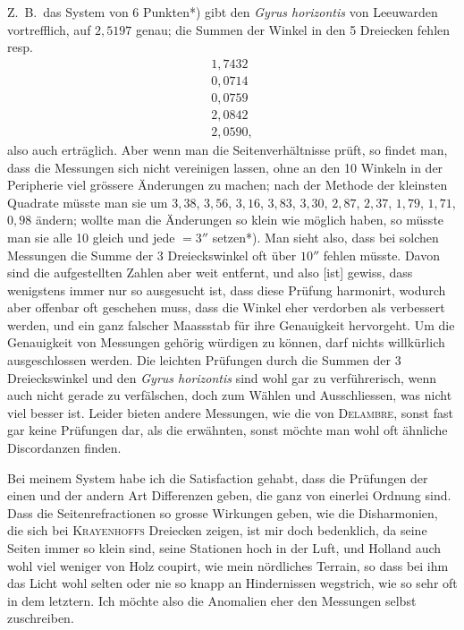 \documentclass[12pt,a4paper]{article}
\theoremstyle{plain}
\theoremstyle{definition}
\theoremstyle{remark}
\begin{document}
Z.\ B.\ das System von 6 Punkten*) gibt den \textit{Gyrus horizontis} von Leeuwarden vortrefflich, auf $2{,}5197$ genau; die Summen der Winkel in den 5 Dreiecken fehlen resp.
\begin{align*}
1{,}7432\\
0{,}0714\\
0{,}0759\\
2{,}0842\\
2{,}0590,
\end{align*}
also auch ertr\"aglich. Aber wenn man die Seitenverh\"altnisse pr\"uft, so findet man, dass die Messungen sich nicht vereinigen lassen, ohne an den 10 Winkeln in der Peripherie viel gr\"ossere \"Anderungen zu machen; nach der Methode der kleinsten Quadrate m\"usste man sie um $3{,}38$, $3{,}56$, $3{,}16$, $3{,}83$, $3{,}30$, $2{,}87$, $2{,}37$, $1{,}79$, $1{,}71$, $0{,}98$ \"andern; wollte man die \"Anderungen so klein wie m\"oglich haben, so m\"usste man sie alle 10 gleich und jede $= 3''$ setzen*). Man sieht also, dass bei solchen Messungen die Summe der 3 Dreieckswinkel oft \"uber $10''$ fehlen m\"usste. Davon sind die aufgestellten Zahlen aber weit entfernt, und also [ist] gewiss, dass wenigstens immer nur so ausgesucht ist, dass diese Pr\"ufung harmonirt, wodurch aber offenbar oft geschehen muss, dass die Winkel eher verdorben als verbessert werden, und ein ganz falscher Maassstab f\"ur ihre Genauigkeit hervorgeht. Um die Genauigkeit von Messungen geh\"orig w\"urdigen zu k\"onnen, darf nichts willk\"urlich ausgeschlossen werden. Die leichten Pr\"ufungen durch die Summen der 3 Dreieckswinkel und den \textit{Gyrus horizontis} sind wohl gar zu verf\"uhrerisch, wenn auch nicht gerade zu verf\"alschen, doch zum W\"ahlen und Ausschliessen, was nicht viel besser ist. Leider bieten andere Messungen, wie die von \textsc{Delambre}, sonst fast gar keine Pr\"ufungen dar, als die erw\"ahnten, sonst m\"ochte man wohl oft \"ahnliche Discordanzen finden.

Bei meinem System habe ich die Satisfaction gehabt, dass die Pr\"ufungen der einen und der andern Art Differenzen geben, die ganz von einerlei Ordnung sind. Dass die Seitenrefractionen so grosse Wirkungen geben, wie die Disharmonien, die sich bei \textsc{Krayenhoffs} Dreiecken zeigen, ist mir doch bedenklich, da seine Seiten immer so klein sind, seine Stationen hoch in der Luft, und Holland auch wohl viel weniger von Holz coupirt, wie mein n\"ordliches Terrain, so dass bei ihm das Licht wohl selten oder nie so knapp an Hindernissen wegstrich, wie so sehr oft in dem letztern. Ich m\"ochte also die Anomalien eher den Messungen selbst zuschreiben.
\end{document}
